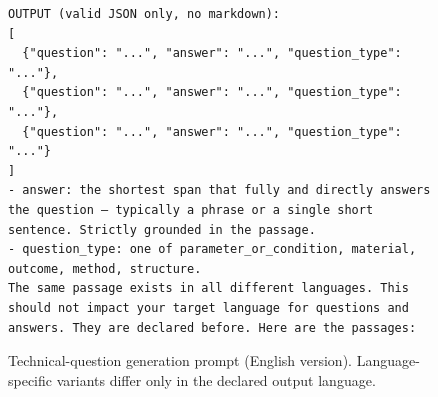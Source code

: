 \begin{figure}[h!]
\begin{minipage}{0.95\textwidth}
\begin{Verbatim}[breaklines=true, breakanywhere=true]
OUTPUT (valid JSON only, no markdown):
[
  {"question": "...", "answer": "...", "question_type": "..."},
  {"question": "...", "answer": "...", "question_type": "..."},
  {"question": "...", "answer": "...", "question_type": "..."}
]
- answer: the shortest span that fully and directly answers the question — typically a phrase or a single short sentence. Strictly grounded in the passage.
- question_type: one of parameter_or_condition, material, outcome, method, structure.
The same passage exists in all different languages. This should not impact your target language for questions and answers. They are declared before. Here are the passages:
\end{Verbatim}
\end{minipage}
\caption{Technical-question generation prompt (English version). Language-specific variants differ only in the declared output language.}
\label{fig:prompt-technical}
\end{figure}

